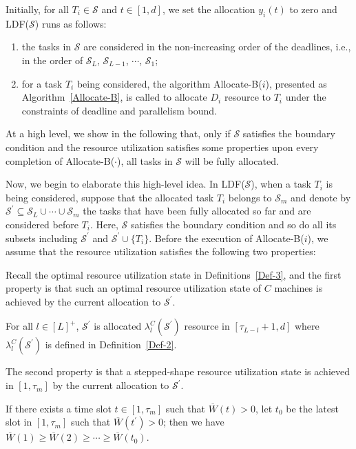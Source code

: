 \documentclass[10pt,journal,compsoc]{IEEEtran}
\begin{document}
Initially, for all $T_{i}\in\mathcal{S}$ and $t\in[1, d]$, we set the allocation $y_{i}(t)$ to zero and LDF($\mathcal{S}$) runs as follows:
\begin{enumerate}
 \setlength\itemsep{0.15em}
  \item the tasks in $\mathcal{S}$ are considered in the non-increasing order of the deadlines, i.e., in the order of $\mathcal{S}_{L}$, $\mathcal{S}_{L-1}$, $\cdots$, $\mathcal{S}_{1}$;

  \item for a task $T_{i}$ being considered, the algorithm Allocate-B($i$), presented as Algorithm~\ref{Allocate-B}, is called to allocate $D_{i}$ resource to $T_{i}$ under the constraints of deadline and parallelism bound.
\end{enumerate}

At a high level, we show in the following that, only if $\mathcal{S}$ satisfies the boundary condition and the resource utilization satisfies some properties upon every completion of Allocate-B($\cdot$), all tasks in $\mathcal{S}$ will be fully allocated.

Now, we begin to elaborate this high-level idea. In LDF($\mathcal{S}$), when a task $T_{i}$ is being considered, suppose that the allocated task $T_{i}$ belongs to $\mathcal{S}_{m}$ and denote by $\mathcal{S}^{\prime}\subseteq\mathcal{S}_{L}\cup\cdots\cup\mathcal{S}_{m}$ the tasks that have been fully allocated so far and are considered before $T_{i}$. Here, $\mathcal{S}$ satisfies the boundary condition and so do all its subsets including $\mathcal{S}^{\prime}$ and $\mathcal{S}^{\prime}\cup\{ T_{i} \}$.  Before the execution of Allocate-B($i$), we assume that the resource utilization satisfies the following two properties:



Recall the optimal resource utilization state in Definitions~\ref{Def-3}, and the first property is that such an optimal resource utilization state of $C$ machines is achieved by the current allocation to $\mathcal{S}^{\prime}$.
\begin{property}\label{proper-1}
For all $l\in[L]^{+}$, $\mathcal{S}^{\prime}$ is allocated $\lambda_{l}^{C}(\mathcal{S}^{\prime})$ resource in $[\tau_{L-l}+1, d]$ where $\lambda_{l}^{C}(\mathcal{S}^{\prime})$ is defined in Definition~\ref{Def-2}.
\end{property}


The second property is that a stepped-shape resource utilization state is achieved in $[1, \tau_{m}]$ by the current allocation to $\mathcal{S}^{\prime}$.
\begin{property}\label{proper-2}
If there exists a time slot $t\in [1,\tau_{m}]$ such that $\overline{W}(t)>0$, let $t_{0}$ be the latest slot in $[1,\tau_{m}]$ such that $\overline{W}(t^{\prime})>0$; then we have $\overline{W}(1)\geq \overline{W}(2)\geq \cdots \geq \overline{W}(t_{0})$.
\end{property}
\end{document}
